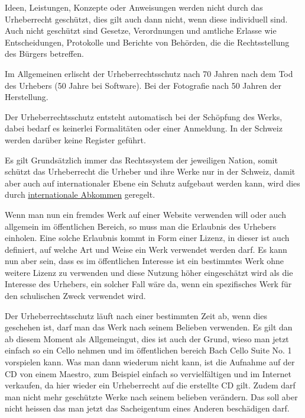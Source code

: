 Ideen, Leistungen, Konzepte oder Anweisungen werden nicht durch das Urheberrecht geschützt, dies gilt auch dann nicht,
wenn diese individuell sind.
Auch nicht geschützt sind Gesetze, Verordnungen und amtliche Erlasse wie Entscheidungen,
Protokolle und Berichte von Behörden, die die Rechtsstellung des Bürgers betreffen.

Im Allgemeinen erlischt der Urheberrechtsschutz nach 70 Jahren nach dem Tod des Urhebers (50 Jahre bei Software).
Bei der Fotografie nach 50 Jahren der Herstellung.

Der Urheberrechtsschutz entsteht automatisch bei der Schöpfung des Werks, dabei bedarf es keinerlei Formalitäten oder einer Anmeldung.
In der Schweiz werden darüber keine Register geführt.

Es gilt Grundsätzlich immer das Rechtssystem der jeweiligen Nation, somit schützt das Urheberrecht die Urheber und ihre
Werke nur in der Schweiz, damit aber auch auf internationaler Ebene ein Schutz aufgebaut werden kann, wird dies durch
\href{https://www.ige.ch/de/recht-und-politik/immaterialgueterrecht-national/urheberrecht.html}{internationale Abkommen} geregelt.

Wenn man nun ein fremdes Werk auf einer Website verwenden will oder auch allgemein im öffentlichen Bereich, so muss
man die Erlaubnis des Urhebers einholen.
Eine solche Erlaubnis kommt in Form einer Lizenz, in dieser ist auch definiert,
auf welche Art und Weise ein Werk verwendet werden darf.
Es kann nun aber sein, dass es im öffentlichen Interesse ist ein bestimmtes Werk ohne weitere Lizenz zu verwenden und
diese Nutzung höher eingeschätzt wird als die Interesse des Urhebers, ein solcher Fall wäre da, wenn ein spezifisches
Werk für den schulischen Zweck verwendet wird.

Der Urheberrechtsschutz läuft nach einer bestimmten Zeit ab, wenn dies geschehen ist, darf man das Werk nach seinem Belieben verwenden.
Es gilt dan ab diesem Moment als Allgemeingut, dies ist auch der Grund, wieso man jetzt einfach so ein Cello nehmen
und im öffentlichen bereich Bach Cello Suite No. 1 vorspielen kann.
Was man dann wiederum nicht kann, ist die Aufnahme auf der CD von einem Maestro,
zum Beispiel einfach so vervielfältigen und im Internet verkaufen, da hier wieder ein Urheberrecht auf die erstellte CD gilt.
Zudem darf man nicht mehr geschützte Werke nach seinem belieben verändern.
Das soll aber nicht heissen das man jetzt das Sacheigentum eines Anderen beschädigen darf.

